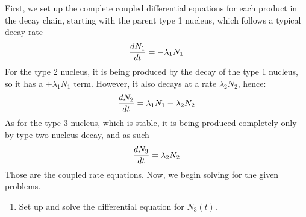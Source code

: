 \documentclass[12pt,a4paper]{article}
\begin{document}
	\begin{solution_pset}
		First, we set up the complete coupled differential equations for each product
		in the decay chain, starting with the parent type 1 nucleus, which follows
		a typical decay rate
		\begin{equation}
			\label{eq:type1decay}
		    \dv{N_1}{t} = - \lambda_1 N_1 
		\end{equation}
		For the type 2 nucleus, it is being produced by the decay of the type 1 nucleus,
		so it has a $+\lambda_1 N_1$ term. However, it also decays at a rate $\lambda_2 N_2$,
		hence:
		\begin{equation}
			\label{eq:type2decay}
			\dv{N_2}{t} = \lambda_1 N_1 - \lambda_2 N_2 
		\end{equation}
		As for the type 3 nucleus, which is stable, it is being produced completely only by
		type two nucleus decay, and as such
		\begin{equation}
			\label{eq:type3decay}
			\dv{N_3}{t} = \lambda_2 N_2 
		\end{equation}
		Those are the coupled rate equations. Now, we begin solving for the given problems.
		\begin{enumerate}[\textbf{(\alph*)}]
		    \item Set up and solve the differential equation for $N_3(t)$.
				  

\end{enumerate}
\end{solution_pset}
\end{document}
